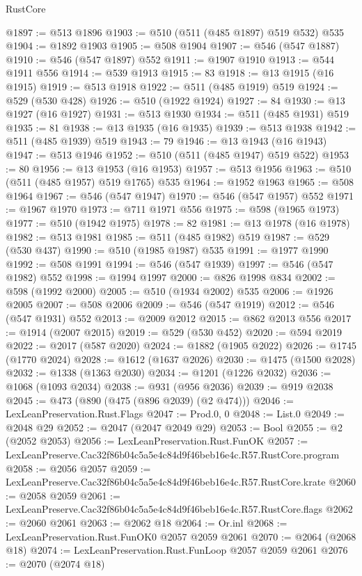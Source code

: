 \begin{lexlean}{RustCore}
\begin{coremodule}
@1897 := @513 @1896
@1903 := @510 (@511 (@485 @1897) @519 @532) @535
@1904 := @1892 @1903
@1905 := @508 @1904
@1907 := @546 (@547 @1887)
@1910 := @546 (@547 @1897) @552
@1911 := @1907 @1910
@1913 := @544 @1911 @556
@1914 := @539 @1913
@1915 := 83
@1918 := @13 @1915 (@16 @1915)
@1919 := @513 @1918
@1922 := @511 (@485 @1919) @519
@1924 := @529 (@530 @428)
@1926 := @510 (@1922 @1924)
@1927 := 84
@1930 := @13 @1927 (@16 @1927)
@1931 := @513 @1930
@1934 := @511 (@485 @1931) @519
@1935 := 81
@1938 := @13 @1935 (@16 @1935)
@1939 := @513 @1938
@1942 := @511 (@485 @1939) @519
@1943 := 79
@1946 := @13 @1943 (@16 @1943)
@1947 := @513 @1946
@1952 := @510 (@511 (@485 @1947) @519 @522)
@1953 := 80
@1956 := @13 @1953 (@16 @1953)
@1957 := @513 @1956
@1963 := @510 (@511 (@485 @1957) @519 @1765) @535
@1964 := @1952 @1963
@1965 := @508 @1964
@1967 := @546 (@547 @1947)
@1970 := @546 (@547 @1957) @552
@1971 := @1967 @1970
@1973 := @711 @1971 @556
@1975 := @598 (@1965 @1973)
@1977 := @510 (@1942 @1975)
@1978 := 82
@1981 := @13 @1978 (@16 @1978)
@1982 := @513 @1981
@1985 := @511 (@485 @1982) @519
@1987 := @529 (@530 @437)
@1990 := @510 (@1985 @1987) @535
@1991 := @1977 @1990
@1992 := @508 @1991
@1994 := @546 (@547 @1939)
@1997 := @546 (@547 @1982) @552
@1998 := @1994 @1997
@2000 := @826 @1998 @834
@2002 := @598 (@1992 @2000)
@2005 := @510 (@1934 @2002) @535
@2006 := @1926 @2005
@2007 := @508 @2006
@2009 := @546 (@547 @1919)
@2012 := @546 (@547 @1931) @552
@2013 := @2009 @2012
@2015 := @862 @2013 @556
@2017 := @1914 (@2007 @2015)
@2019 := @529 (@530 @452)
@2020 := @594 @2019
@2022 := @2017 (@587 @2020)
@2024 := @1882 (@1905 @2022)
@2026 := @1745 (@1770 @2024)
@2028 := @1612 (@1637 @2026)
@2030 := @1475 (@1500 @2028)
@2032 := @1338 (@1363 @2030)
@2034 := @1201 (@1226 @2032)
@2036 := @1068 (@1093 @2034)
@2038 := @931 (@956 @2036)
@2039 := @919 @2038
@2045 := @473 (@890 (@475 (@896 @2039) (@2 @474)))
@2046 := LexLeanPreservation.Rust.Flags
@2047 := Prod.{0, 0}
@2048 := List.{0}
@2049 := @2048 @29
@2052 := @2047 (@2047 @2049 @29)
@2053 := Bool
@2055 := @2 (@2052 @2053)
@2056 := LexLeanPreservation.Rust.FunOK
@2057 := LexLeanPreserve.Cac32f86b04c5a5e4c84d9f46beb16e4c.R57.RustCore.program
@2058 := @2056 @2057
@2059 := LexLeanPreserve.Cac32f86b04c5a5e4c84d9f46beb16e4c.R57.RustCore.krate
@2060 := @2058 @2059
@2061 := LexLeanPreserve.Cac32f86b04c5a5e4c84d9f46beb16e4c.R57.RustCore.flags
@2062 := @2060 @2061
@2063 := @2062 @18
@2064 := Or.inl
@2068 := LexLeanPreservation.Rust.FunOK0 @2057 @2059 @2061
@2070 := @2064 (@2068 @18)
@2074 := LexLeanPreservation.Rust.FunLoop @2057 @2059 @2061
@2076 := @2070 (@2074 @18)

\end{coremodule}
\end{lexlean}
